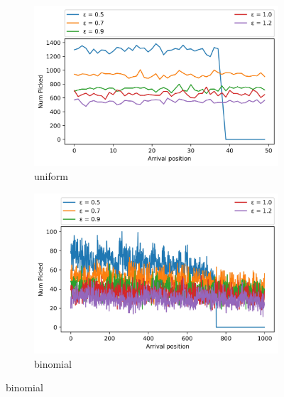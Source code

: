 \begin{figure}[h!]
  \begin{subfigure}[t]{.5\textwidth}
    \centering
    \includegraphics[width=\linewidth]{Images/extension/FairIIDProphet_uniform.jpeg}
    \caption{uniform}
    \label{fig:extension_fairIID_uniform}
    
  \end{subfigure}
  \hfill
  \begin{subfigure}[t]{.5\textwidth}
    \centering
    \includegraphics[width=\linewidth]{Images/extension/FairIIDProphet_binomial.jpeg}
    \caption{binomial}
    \label{fig:extension_fairIID_binomial}
  \end{subfigure}

  \medskip


\end{figure}
